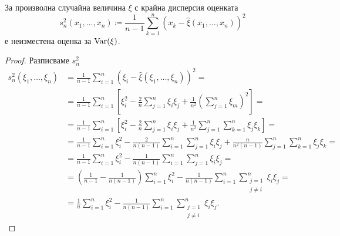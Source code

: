 \documentclass[
  numbers=endperiod,
  headings=standardclasses,
  bibliography=totocnumbered,
]{scrartcl}
\begin{document}
\begin{proposition}\label{thm:corrected_variation_is_unbiased_estimator}
  За произволна случайна величина \( \xi \) с крайна дисперсия оценката
  \begin{equation*}
    s_n^2(x_1, \ldots, x_n) \coloneqq \frac 1 {n-1} \sum_{k=1}^n {(x_k - \hat \xi(x_1, \ldots, x_n))}^2
  \end{equation*}
  е неизместена оценка за \( \operatorname{Var}(\xi) \).
\end{proposition}
\begin{proof}
  Разписваме \( s_n^2 \)
  \begingroup
  \allowdisplaybreaks
  \begin{align*}
    s_n^2(\xi_1, \ldots, \xi_n)
    &=
    \frac 1 {n-1} \sum_{i=1}^n {(\xi_i - \hat \xi(\xi_1, \ldots, \xi_n))}^2
    = \\ &=
    \frac 1 {n-1} \sum_{i=1}^n \left[\xi_i^2 - \frac 2 n \sum_{j=1}^n \xi_i \xi_j + \frac 1 {n^2} {\left( \sum_{j=1}^n \xi_m \right)}^2 \right]
    = \\ &=
    \frac 1 {n-1} \sum_{i=1}^n \left[\xi_i^2 - \frac 2 n \sum_{j=1}^n \xi_i \xi_j + \frac 1 {n^2} \sum_{j=1}^n \sum_{k=1}^n \xi_j \xi_k \right]
    = \\ &=
    \frac 1 {n-1} \sum_{i=1}^n \xi_i^2 - \frac 2 {n(n-1)} \sum_{i=1}^n \sum_{j=1}^n \xi_i \xi_j + \frac n {n^2 (n-1)} \sum_{j=1}^n \sum_{k=1}^n \xi_j \xi_k
    = \\ &=
    \frac 1 {n-1} \sum_{i=1}^n \xi_i^2 - \frac 1 {n(n-1)} \sum_{i=1}^n \sum_{j=1}^n \xi_i \xi_j
    = \\ &=
    \left(\frac 1 {n-1} - \frac 1 {n(n-1)} \right) \sum_{i=1}^n \xi_i^2 - \frac 1 {n(n-1)} \sum_{i=1}^n \sum_{\substack{j=1 \\ j\neq i}}^n \xi_i \xi_j
    = \\ &=
    \frac 1 n \sum_{i=1}^n \xi_i^2 - \frac 1 {n(n-1)} \sum_{i=1}^n \sum_{\substack{j=1 \\ j\neq i}}^n \xi_i \xi_j.
  \end{align*}
  \endgroup


\end{proof}
\end{document}
